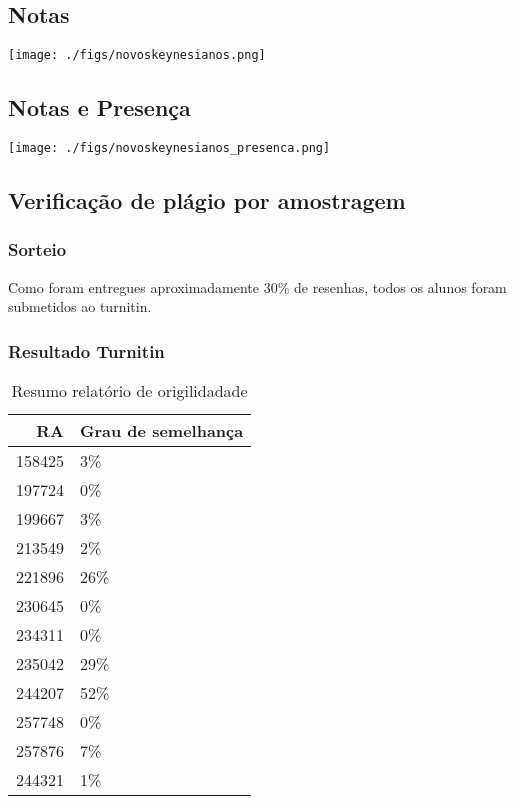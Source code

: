 \documentclass[11pt]{article}
\begin{document}
\subsection{Notas}
\label{sec:org00827a5}
\begin{center}
\texttt{[image: ./figs/novoskeynesianos.png]}
\end{center}



\subsection{Notas e Presença}
\label{sec:org8c539d3}
\begin{center}
\texttt{[image: ./figs/novoskeynesianos\_presenca.png]}
\end{center}
\subsection{Verificação de plágio por amostragem}
\label{sec:orgc6c723c}
\subsubsection{Sorteio}
\label{sec:org7fbbc3f}

Como foram entregues aproximadamente 30\% de resenhas, todos os alunos foram submetidos ao turnitin.

\subsubsection{Resultado Turnitin}
\label{sec:org51d48ef}

\begin{table}[htbp]
\caption{\label{TurnitinNvK}Resumo relatório de origilidadade}
\centering
\begin{tabular}{rl}
\hline
RA & Grau de semelhança\\
\hline
158425 & 3\%\\
197724 & 0\%\\
199667 & 3\%\\
213549 & 2\%\\
221896 & 26\%\\
230645 & 0\%\\
234311 & 0\%\\
235042 & 29\%\\
244207 & 52\%\\
257748 & 0\%\\
257876 & 7\%\\
244321 & 1\%\\
\hline
\end{tabular}
\end{table}
\end{document}
